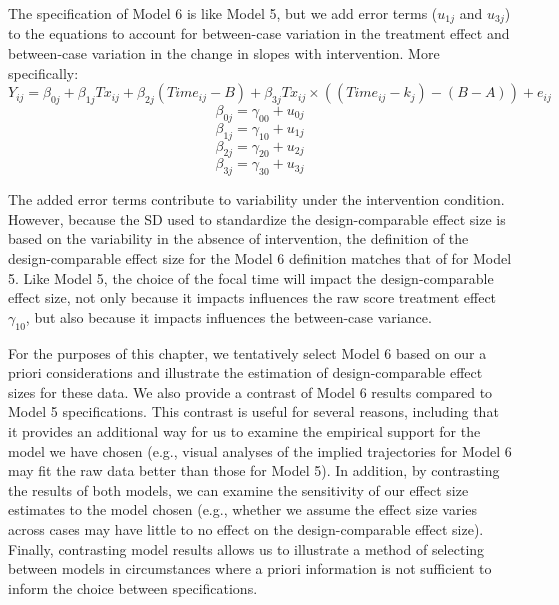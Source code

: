 \documentclass[
]{book}
\begin{document}
The specification of Model 6 is like Model 5, but we add error terms (\(u_{1j}\) and \(u_{3j}\)) to the equations to account for between-case variation in the treatment effect and between-case variation in the change in slopes with intervention. More specifically:
\begin{equation}
\label{eq:M6-L1}
Y_{ij} = \beta_{0j} + \beta_{1j}Tx_{ij} + \beta_{2j} (Time_{ij}-B)+ \beta_{3j}Tx_{ij}\times((Time_{ij}-k_j)-(B-A)) + e_{ij}
\end{equation}
\begin{equation}
\label{eq:M6-L2-intercept}
\beta_{0j} = \gamma_{00} + u_{0j}
\end{equation}
\begin{equation}
\label{eq:M6-L2-slope-trt}
\beta_{1j} = \gamma_{10} + u_{1j}
\end{equation}
\begin{equation}
\label{eq:M6-L2-slope-time}
\beta_{2j} = \gamma_{20} + u_{2j}
\end{equation}
\begin{equation}
\label{eq:M6-L2-slope-interaction}
\beta_{3j} = \gamma_{30} + u_{3j}
\end{equation}

The added error terms contribute to variability under the intervention condition. However, because the SD used to standardize the design-comparable effect size is based on the variability in the absence of intervention, the definition of the design-comparable effect size for the Model 6 definition matches that of for Model 5. Like Model 5, the choice of the focal time will impact the design-comparable effect size, not only because it impacts influences the raw score treatment effect \(\gamma_{10}\), but also because it impacts influences the between-case variance.

For the purposes of this chapter, we tentatively select Model 6 based on our a priori considerations and illustrate the estimation of design-comparable effect sizes for these data. We also provide a contrast of Model 6 results compared to Model 5 specifications. This contrast is useful for several reasons, including that it provides an additional way for us to examine the empirical support for the model we have chosen (e.g., visual analyses of the implied trajectories for Model 6 may fit the raw data better than those for Model 5). In addition, by contrasting the results of both models, we can examine the sensitivity of our effect size estimates to the model chosen (e.g., whether we assume the effect size varies across cases may have little to no effect on the design-comparable effect size). Finally, contrasting model results allows us to illustrate a method of selecting between models in circumstances where a priori information is not sufficient to inform the choice between specifications.
\end{document}
